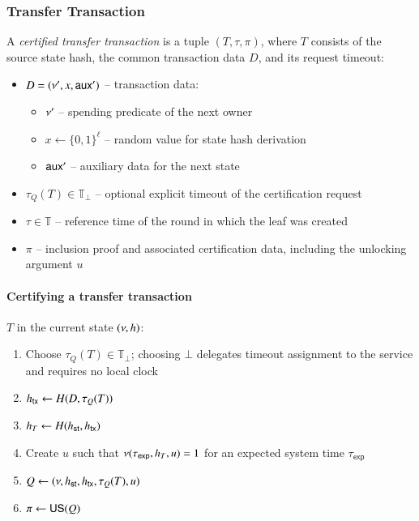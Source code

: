 \subsubsection{Transfer Transaction}\label{sec:transfer-tx}

A \emph{certified transfer transaction} is a tuple $(T, \tau, \pi)$, where $T$ consists of the source state hash, the common transaction data $D$, and its request timeout:
\begin{itemize}
	\item $D = (\nu', x, \mathsf{aux}')$ -- transaction data:
	\begin{itemize}
		\item $\nu'$ -- spending predicate of the next owner
		\item $x \gets \{0,1\}^\ell$ -- random value for state hash derivation
		\item $\mathsf{aux}'$ -- auxiliary data for the next state
	\end{itemize}
	\item $\tau_Q(T)\in\mathbb{T}_\bot$ -- optional explicit timeout of the certification request
	\item $\tau\in\mathbb T$ -- reference time of the round in which the leaf was created
	\item $\pi$ -- inclusion proof and associated certification data, including the unlocking argument $u$
\end{itemize}

\paragraph{Certifying a transfer transaction} $T$ in the current state $(\nu, h)$:
\begin{enumerate}
	\item Choose $\tau_Q(T)\in\mathbb{T}_\bot$; choosing $\bot$ delegates timeout assignment to the service and requires no local clock
	\item ${h_\mathsf{tx}} \gets H(D, \tau_Q(T))$
	\item $h_T \gets H({h_\mathsf{st}}, {h_\mathsf{tx}})$
	\item Create $u$ such that $\nu(\tau_\mathsf{exp}, h_T, u) = 1$ for an expected system time $\tau_\mathsf{exp}$
	\item $Q \gets (\nu, {h_\mathsf{st}}, {h_\mathsf{tx}}, \tau_Q(T), u)$
	\item $\pi \gets \mathsf{US}(Q)$
\end{enumerate}

